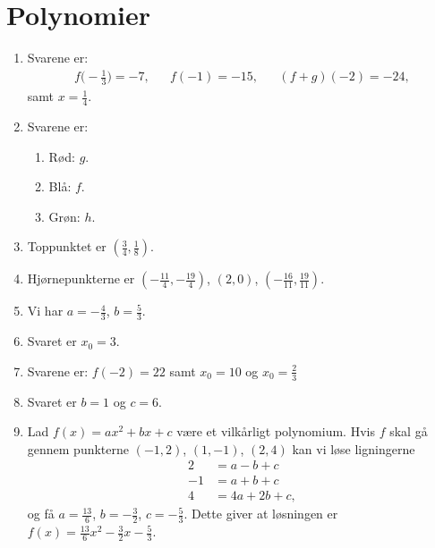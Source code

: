\newpage
\section{Polynomier}
\begin{enumerate}
	\item Svarene er:
	\begin{align*}
	f\Big(-\frac{1}{3}\Big)=-7,&&f(-1)=-15,&& (f+g)(-2)=-24,
	\end{align*} 
	samt $x=\frac{1}{4}$.
	
	\item \label{it:poly1ans} Svarene er:
	\begin{enumerate}
		\item Rød: $g$.
		\item Blå: $f$.
		\item Grøn: $h$.
	\end{enumerate}
	
	\item Toppunktet er $ (\frac{3}{4},\frac{1}{8}) $.
	
	\item Hjørnepunkterne er $(-\frac{11}{4},-\frac{19}{4})$, $ (2,0) $, $ (-\frac{16}{11},\frac{19}{11}) $.
	
	\item Vi har $a=-\frac{4}{3}$, $ b=\frac{5}{3} $.
	
	\item Svaret er $ x_0=3 $.
	
	\item Svarene er: $ f(-2)=22 $ samt $x_0=10$ og $x_0=\frac{2}{3}$
	
	\item Svaret er $b=1$ og $c=6$.
	
	\item Lad $f(x)=ax^2+bx+c$ være et vilkårligt polynomium. Hvis $f$ skal gå gennem punkterne $(-1,2)$, $(1,-1)$, $(2,4)$ kan vi løse ligningerne
	\begin{align*}
	2&=a-b+c\\
	-1&=a+b+c\\
	4&=4a+2b+c,
	\end{align*}
	og få $ a=\frac{13}{6} $, $ b=-\frac{3}{2} $, $ c=-\frac{5}{3} $. Dette giver at løsningen er $ f(x)=\frac{13}{6}x^2-\frac{3}{2}x-\frac{5}{3} $.
	

\end{enumerate}
